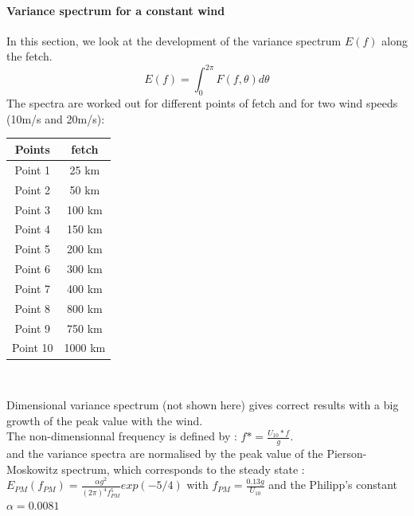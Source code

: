 \paragraph{Variance spectrum for a constant wind}
In this section, we look at the development of the variance spectrum $E(f)$ along the fetch.
\[ E(f) = \int_{0}^{2\pi} F(f,\theta )d\theta
\]
The spectra are worked out for different points of fetch and for two wind speeds (10m/s and 20m/s):\\
\begin{center}
\begin{tabular}{c|c}
Points & fetch\\
\hline
Point 1 & 25 km \\
Point 2 & 50 km \\
Point 3 & 100 km \\
Point 4 & 150 km \\
Point 5 & 200 km\\
Point 6 & 300 km \\
Point 7 & 400 km \\
Point 8 & 800 km\\
Point 9 & 750 km\\
Point 10 & 1000 km\\
\end{tabular}\\
\end{center}
Dimensional variance spectrum (not shown here) gives correct results with a big growth of the peak value with the wind.\\
The non-dimensionnal frequency is defined by : $f* = \frac{U_{10}*f}{g}$.\\
and the variance spectra are normalised by the peak value of the Pierson-Moskowitz spectrum, which corresponds to the steady state :\\
$E_{PM}(f_{PM}) = \frac{\alpha g^2}{(2\pi)^4 f_{PM}^5} exp(-5/4)$ with $f_{PM}=\frac{0.13 g}{U_{10}}$ and the Philipp's constant $\alpha = 0.0081$\\
